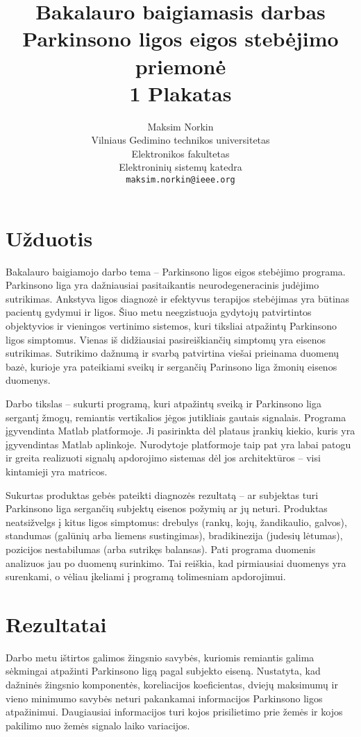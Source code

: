 \documentclass[a4paper,11pt,twocolumn]{IEEEtran}
\author{Maksim Norkin\\Vilniaus Gedimino technikos universitetas\\Elektronikos fakultetas\\Elektroninių sistemų katedra\\\texttt{maksim.norkin@ieee.org}}
\title{Bakalauro baigiamasis darbas\\Parkinsono ligos eigos stebėjimo priemonė\\1 Plakatas}
\begin{document}
	\maketitle
	
	\section{Užduotis}
	
	Bakalauro baigiamojo darbo tema -- Parkinsono ligos eigos stebėjimo programa. Parkinsono liga yra dažniausiai pasitaikantis neurodegeneracinis judėjimo sutrikimas. Ankstyva ligos diagnozė ir efektyvus terapijos stebėjimas yra būtinas pacientų gydymui ir ligos. Šiuo metu neegzistuoja gydytojų patvirtintos objektyvios ir vieningos vertinimo sistemos, kuri tiksliai atpažintų Parkinsono ligos simptomus. Vienas iš didžiausiai pasireiškiančių simptomų yra eisenos sutrikimas. Sutrikimo dažnumą ir svarbą patvirtina viešai prieinama duomenų bazė, kurioje yra pateikiami sveikų ir sergančių Parinsono liga žmonių eisenos duomenys.
	
	Darbo tikslas -- sukurti programą, kuri atpažintų sveiką ir Parkinsono liga sergantį žmogų, remiantis vertikalios jėgos jutikliais gautais signalais. Programa įgyvendinta Matlab platformoje. Ji pasirinkta dėl plataus įrankių kiekio, kuris yra įgyvendintas Matlab aplinkoje. Nurodytoje platformoje taip pat yra labai patogu ir greita realizuoti signalų apdorojimo sistemas dėl jos architektūros -- visi kintamieji yra matricos. 
	
	Sukurtas produktas gebės pateikti diagnozės rezultatą -- ar subjektas turi Parkinsono liga sergančių subjektų eisenos požymių ar jų neturi. Produktas neatsižvelgs į kitus ligos simptomus: drebulys (rankų, kojų, žandikaulio, galvos), standumas (galūnių arba liemens sustingimas), bradikinezija (judesių lėtumas), pozicijos nestabilumas (arba sutrikęs balansas). Pati programa duomenis analizuos jau po duomenų surinkimo. Tai reiškia, kad pirmiausiai duomenys yra surenkami, o vėliau įkeliami į programą tolimesniam apdorojimui.
	
	\section{Rezultatai}
	
	Darbo metu ištirtos galimos žingsnio savybės, kuriomis remiantis galima sėkmingai atpažinti Parkinsono ligą pagal subjekto eiseną. Nustatyta, kad dažninės žingsnio komponentės, koreliacijos koeficientas, dviejų maksimumų ir vieno minimumo savybės neturi pakankamai informacijos Parkinsono ligos atpažinimui. Daugiausiai informacijos turi kojos prisilietimo prie žemės ir kojos pakilimo nuo žemės signalo laiko variacijos.
\end{document}
